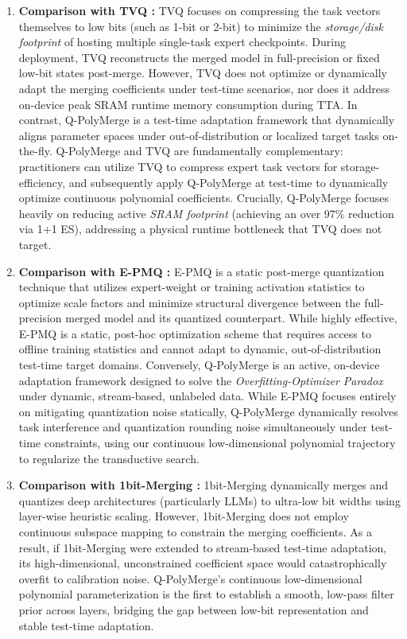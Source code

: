 \begin{enumerate}
    \item \textbf{Comparison with TVQ \cite{tvq2025}:} TVQ focuses on compressing the task vectors themselves to low bits (such as 1-bit or 2-bit) to minimize the \emph{storage/disk footprint} of hosting multiple single-task expert checkpoints. During deployment, TVQ reconstructs the merged model in full-precision or fixed low-bit states post-merge. However, TVQ does not optimize or dynamically adapt the merging coefficients under test-time scenarios, nor does it address on-device peak SRAM runtime memory consumption during TTA. 
    In contrast, Q-PolyMerge is a test-time adaptation framework that dynamically aligns parameter spaces under out-of-distribution or localized target tasks on-the-fly. Q-PolyMerge and TVQ are fundamentally complementary: practitioners can utilize TVQ to compress expert task vectors for storage-efficiency, and subsequently apply Q-PolyMerge at test-time to dynamically optimize continuous polynomial coefficients. Crucially, Q-PolyMerge focuses heavily on reducing active \emph{SRAM footprint} (achieving an over 97\% reduction via 1+1 ES), addressing a physical runtime bottleneck that TVQ does not target.
    
    \item \textbf{Comparison with E-PMQ \cite{epmq2026}:} E-PMQ is a static post-merge quantization technique that utilizes expert-weight or training activation statistics to optimize scale factors and minimize structural divergence between the full-precision merged model and its quantized counterpart. While highly effective, E-PMQ is a static, post-hoc optimization scheme that requires access to offline training statistics and cannot adapt to dynamic, out-of-distribution test-time target domains. 
    Conversely, Q-PolyMerge is an active, on-device adaptation framework designed to solve the \emph{Overfitting-Optimizer Paradox} under dynamic, stream-based, unlabeled data. While E-PMQ focuses entirely on mitigating quantization noise statically, Q-PolyMerge dynamically resolves task interference and quantization rounding noise simultaneously under test-time constraints, using our continuous low-dimensional polynomial trajectory to regularize the transductive search.
    
    \item \textbf{Comparison with 1bit-Merging \cite{onebitmerging2025}:} 1bit-Merging dynamically merges and quantizes deep architectures (particularly LLMs) to ultra-low bit widths using layer-wise heuristic scaling. However, 1bit-Merging does not employ continuous subspace mapping to constrain the merging coefficients. As a result, if 1bit-Merging were extended to stream-based test-time adaptation, its high-dimensional, unconstrained coefficient space would catastrophically overfit to calibration noise. Q-PolyMerge's continuous low-dimensional polynomial parameterization is the first to establish a smooth, low-pass filter prior across layers, bridging the gap between low-bit representation and stable test-time adaptation.
\end{enumerate}

